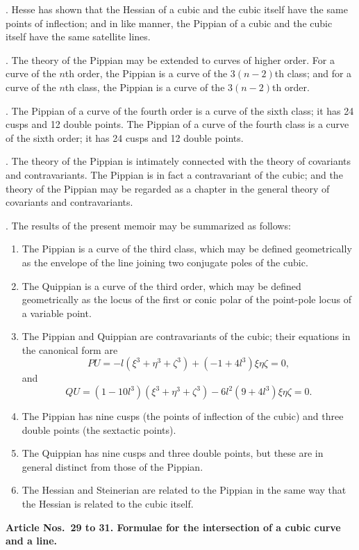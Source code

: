 \documentclass[11pt,a4paper]{book}
\begin{document}
\begin{center}
. Hesse has shown that the Hessian of a cubic and the
cubic itself have the same points of inflection; and in like
manner, the Pippian of a cubic and the cubic itself have the
same satellite lines.

. The theory of the Pippian may be extended to curves
of higher order. For a curve of the $n$th order, the Pippian
is a curve of the $3(n-2)$th class; and for a curve of the $n$th
class, the Pippian is a curve of the $3(n-2)$th order.

. The Pippian of a curve of the fourth order is a curve
of the sixth class; it has 24 cusps and 12 double points. The
Pippian of a curve of the fourth class is a curve of the sixth
order; it has 24 cusps and 12 double points.

. The theory of the Pippian is intimately connected with
the theory of covariants and contravariants. The Pippian is
in fact a contravariant of the cubic; and the theory of the
Pippian may be regarded as a chapter in the general theory of
covariants and contravariants.

. The results of the present memoir may be summarized
as follows:
\begin{enumerate}
\item The Pippian is a curve of the third class, which may be
defined geometrically as the envelope of the line joining two
conjugate poles of the cubic.
\item The Quippian is a curve of the third order, which may be
defined geometrically as the locus of the first or conic polar of
the point-pole locus of a variable point.
\item The Pippian and Quippian are contravariants of the cubic;
their equations in the canonical form are
\[PU = -l(\xi^{3} + \eta^{3} + \zeta^{3}) + (-1 + 4l^{3})\xi\eta\zeta = 0,\]
and
\[QU = (1 - 10l^{3})(\xi^{3} + \eta^{3} + \zeta^{3}) - 6l^{2}(9 + 4l^{3})\xi\eta\zeta = 0.\]
\item The Pippian has nine cusps (the points of inflection of the
cubic) and three double points (the sextactic points).
\item The Quippian has nine cusps and three double points, but
these are in general distinct from those of the Pippian.
\item The Hessian and Steinerian are related to the Pippian in
the same way that the Hessian is related to the cubic itself.
\end{enumerate}

\medskip\noindent\textbf{Article Nos.~29 to 31. Formulae for the intersection of a
cubic curve and a line.}


\end{center}
\end{document}
